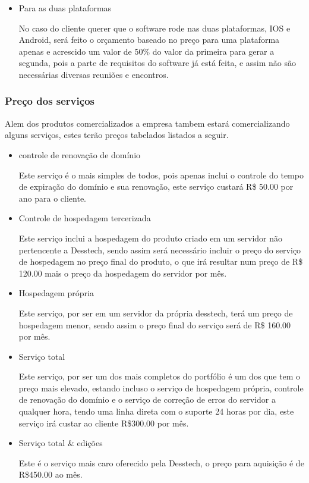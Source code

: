 \begin{itemize}
\begin{itemize}
					\item{Para as duas plataformas}

						No caso do cliente querer que o software rode nas duas plataformas, IOS e Android, será feito o orçamento baseado no preço para uma plataforma apenas e acrescido um valor de 50\% do valor da primeira para gerar a segunda, pois a parte de requisitos do software já está feita, e assim não são necessárias diversas reuniões e encontros.

				\end{itemize}
		\end{itemize}

	\subsubsection{Preço dos serviços}

		Alem dos produtos comercializados a empresa tambem estará comercializando alguns serviços, estes terão preços tabelados listados a seguir.

		\begin{itemize}
			\item{controle de renovação de domínio}

				Este serviço é o mais simples de todos, pois apenas inclui o controle do tempo de expiração do domínio e sua renovação, este serviço custará R\$ 50.00 por ano para o cliente.

			\item{Controle de hospedagem tercerizada}

				Este serviço inclui a hospedagem do produto criado em um servidor não pertencente a Desstech, sendo assim será necessário incluir o preço do serviço de hospedagem no preço final do produto, o que irá resultar num preço de R\$ 120.00 mais o preço da hospedagem do servidor por mês.

			\item{Hospedagem própria}

				Este serviço, por ser em um servidor da própria desstech, terá um preço de hospedagem menor, sendo assim o preço final do serviço será de R\$ 160.00 por mês.

			\item{Serviço total}

				Este serviço, por ser um dos mais completos do portfólio é um dos que tem o preço mais elevado, estando incluso o serviço de hospedagem própria, controle de renovação do domínio e o serviço de correção de erros do servidor a qualquer hora, tendo uma linha direta com o suporte 24 horas por dia, este serviço irá custar ao cliente R\$300.00 por mês.

			\item{Serviço total \& edições}

				Este é o serviço mais caro oferecido pela Desstech, o preço para aquisição é de R\$450.00 ao mês.

		\end{itemize}

